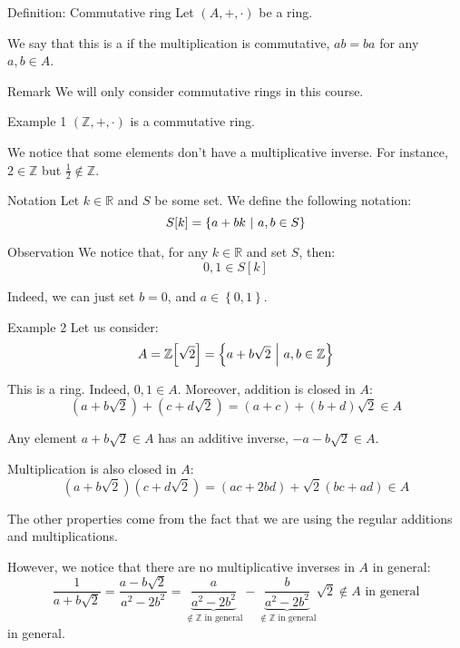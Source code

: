 \documentclass[a4paper]{article}
\begin{document}
\begin{parag}{Definition: Commutative ring}
    Let $\left(A, +, \cdot \right)$ be a ring.

    We say that this is a  if the multiplication is commutative, $ab = ba$ for any $a, b \in A$.

    \begin{subparag}{Remark}
        We will only consider commutative rings in this course.
    \end{subparag}
\end{parag}


\begin{parag}{Example 1}
    $\left(\mathbb{Z}, +, \cdot \right)$ is a commutative ring.

    We notice that some elements don't have a multiplicative inverse. For instance, $2 \in \mathbb{Z}$ but $\frac{1}{2} \not \in \mathbb{Z}$.
\end{parag}

\begin{parag}{Notation}
    Let $k \in \mathbb{R}$ and $S$ be some set. We define the following notation: 
    \[S \left[k\right] = \left\{a + b k \suchthat a, b \in S\right\}\]
    
    \begin{subparag}{Observation}
        We notice that, for any $k \in \mathbb{R}$ and set $S$, then:
        \[0, 1 \in S\left[k\right]\]

        Indeed, we can just set $b = 0$, and $a \in \left\{0, 1\right\}$.
    \end{subparag}
\end{parag}


\begin{parag}{Example 2}
    Let us consider: 
    \[A = \mathbb{Z} \left[\sqrt{2}\right] = \left\{a + b \sqrt{2} \suchthat a, b \in \mathbb{Z}\right\}\]
    
    This is a ring. Indeed, $0, 1 \in A$. Moreover, addition is closed in $A$: 
    \[\left(a + b\sqrt{2}\right) + \left(c + d\sqrt{2}\right) = \left(a+c\right) + \left(b+d\right)\sqrt{2} \in A\]

    Any element $a + b\sqrt{2} \in A$ has an additive inverse, $-a - b\sqrt{2} \in A$.

    Multiplication is also closed in $A$: 
    \[\left(a + b\sqrt{2}\right)\left(c + d\sqrt{2}\right) = \left(ac + 2bd\right) + \sqrt{2}\left(bc + ad\right) \in A\]
    
    The other properties come from the fact that we are using the regular additions and multiplications.

    However, we notice that there are no multiplicative inverses in $A$ in general: 
    \[\frac{1}{a + b\sqrt{2}} = \frac{a - b\sqrt{2}}{a^2 - 2b^2} = \underbrace{\frac{a}{a^2 - 2b^2}}_{\not \in \mathbb{Z} \text{ in general}} - \underbrace{\frac{b}{a^2 - 2b^2}}_{\not\in\mathbb{Z} \text{ in general}}\sqrt{2} \not \in A \text{ in general}\]
    in general.
\end{parag}
\end{document}
